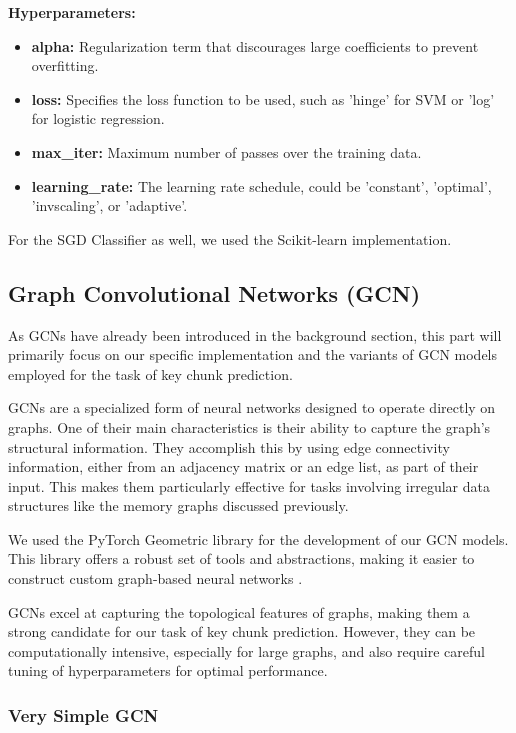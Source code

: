 \textbf{Hyperparameters:}
\begin{itemize}
  \item \textbf{alpha:} Regularization term that discourages large coefficients to prevent overfitting.
  \item \textbf{loss:} Specifies the loss function to be used, such as 'hinge' for SVM or 'log' for logistic regression.
  \item \textbf{max\_iter:} Maximum number of passes over the training data.
  \item \textbf{learning\_rate:} The learning rate schedule, could be 'constant', 'optimal', 'invscaling', or 'adaptive'.
\end{itemize}

For the SGD Classifier as well, we used the Scikit-learn implementation\cite{ScikitLearn}.

\subsection{Graph Convolutional Networks (GCN)}

As GCNs have already been introduced in the background section, this part will primarily focus on our specific implementation and the variants of GCN models employed for the task of key chunk prediction.

GCNs are a specialized form of neural networks designed to operate directly on graphs. One of their main characteristics is their ability to capture the graph's structural information. They accomplish this by using edge connectivity information, either from an adjacency matrix or an edge list, as part of their input. This makes them particularly effective for tasks involving irregular data structures like the memory graphs discussed previously.

We used the PyTorch Geometric library for the development of our GCN models. This library offers a robust set of tools and abstractions, making it easier to construct custom graph-based neural networks \cite{PyTorchGeometric19}.

GCNs excel at capturing the topological features of graphs, making them a strong candidate for our task of key chunk prediction. However, they can be computationally intensive, especially for large graphs, and also require careful tuning of hyperparameters for optimal performance.

\subsubsection{Very Simple GCN}

